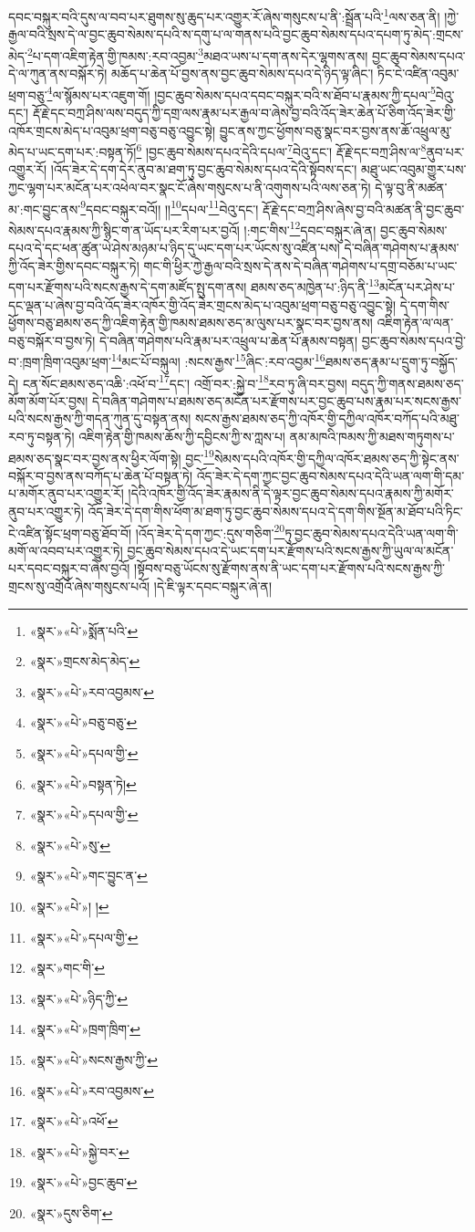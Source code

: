 དབང་བསྐུར་བའི་དུས་ལ་བབ་པར་ཐུགས་སུ་ཆུད་པར་འགྱུར་རོ་ཞེས་གསུངས་པ་ནི་:སྦྲོན་པའི་\footnote{«སྣར་»«པེ་»སྨོན་པའི་}ལས་ཅན་ནི། །ཀྱེ་རྒྱལ་བའི་སྲས་དེ་ལ་བྱང་ཆུབ་སེམས་དཔའི་ས་དགུ་པ་ལ་གནས་པའི་བྱང་ཆུབ་སེམས་དཔའ་དཔག་ཏུ་མེད་:གྲངས་མེད་\footnote{«སྣར་»གྲངས་མེད་མེད་}པ་དག་འཇིག་རྟེན་གྱི་ཁམས་:རབ་འབྱམ་\footnote{«སྣར་»«པེ་»རབ་འབྱམས་}མཐའ་ཡས་པ་དག་ནས་དེར་ལྷགས་ནས། བྱང་ཆུབ་སེམས་དཔའ་དེ་ལ་ཀུན་ནས་བསྐོར་ཏེ། མཆོད་པ་ཆེན་པོ་བྱས་ནས་བྱང་ཆུབ་སེམས་དཔའ་དེ་ཉིད་ལྟ་ཞིང་། ཏིང་ངེ་འཛིན་འབུམ་ཕྲག་བཅུ་\footnote{«སྣར་»«པེ་»བཅུ་བཅུ་}ལ་སྙོམས་པར་འཇུག་གོ། །བྱང་ཆུབ་སེམས་དཔའ་དབང་བསྐུར་བའི་ས་ཐོབ་པ་རྣམས་ཀྱི་དཔལ་\footnote{«སྣར་»«པེ་»དཔལ་གྱི་}བེའུ་དང་། རྡོ་རྗེ་དང་བཀྲ་ཤིས་ལས་བདུད་ཀྱི་དགྲ་ལས་རྣམ་པར་རྒྱལ་བ་ཞེས་བྱ་བའི་འོད་ཟེར་ཆེན་པོ་ཅིག་འོད་ཟེར་གྱི་འཁོར་གྲངས་མེད་པ་འབུམ་ཕྲག་བཅུ་བཅུ་འབྱུང་སྟེ། བྱུང་ནས་ཀྱང་ཕྱོགས་བཅུ་སྣང་བར་བྱས་ནས་ཆོ་འཕྲུལ་མུ་མེད་པ་ཡང་དག་པར་:བསྟན་ཏོ།\footnote{«སྣར་»«པེ་»བསྟན་ཏེ།} །བྱང་ཆུབ་སེམས་དཔའ་དེའི་དཔལ་\footnote{«སྣར་»«པེ་»དཔལ་གྱི་}བེའུ་དང་། རྡོ་རྗེ་དང་བཀྲ་ཤིས་ལ་\footnote{«སྣར་»«པེ་»སུ་}ནུབ་པར་འགྱུར་རོ། །འོད་ཟེར་དེ་དག་དེར་ནུབ་མ་ཐག་ཏུ་བྱང་ཆུབ་སེམས་དཔའ་དེའི་སྟོབས་དང་། མཐུ་ཡང་འབུམ་གྱུར་པས་ཀྱང་ལྷག་པར་མངོན་པར་འཕེལ་བར་སྣང་ངོ་ཞེས་གསུངས་པ་ནི་འགུགས་པའི་ལས་ཅན་ཏེ། དེ་ལྟ་བུ་ནི་མཚན་མ་:གང་བྱུང་ནས་\footnote{«སྣར་»«པེ་»གང་བྱུང་ན་}དབང་བསྐུར་བའོ།། །།\footnote{«སྣར་»«པེ་»། །}དཔལ་\footnote{«སྣར་»«པེ་»དཔལ་གྱི་}བེའུ་དང་། རྡོ་རྗེ་དང་བཀྲ་ཤིས་ཞེས་བྱ་བའི་མཚན་ནི་བྱང་ཆུབ་སེམས་དཔའ་རྣམས་ཀྱི་སྙིང་ག་ན་ཡོད་པར་རིག་པར་བྱའོ། །:གང་གིས་\footnote{«སྣར་»གང་གི་}དབང་བསྐུར་ཞེ་ན། བྱང་ཆུབ་སེམས་དཔའ་དེ་དང་ཕན་ཚུན་ཡེ་ཤེས་མཉམ་པ་ཉིད་དུ་ཡང་དག་པར་ཡོངས་སུ་འཛིན་པས། དེ་བཞིན་གཤེགས་པ་རྣམས་ཀྱི་འོད་ཟེར་གྱིས་དབང་བསྐུར་ཏེ། གང་གི་ཕྱིར་ཀྱེ་རྒྱལ་བའི་སྲས་དེ་ནས་དེ་བཞིན་གཤེགས་པ་དགྲ་བཅོམ་པ་ཡང་དག་པར་རྫོགས་པའི་སངས་རྒྱས་དེ་དག་མཛོད་སྤུ་དག་ནས། ཐམས་ཅད་མཁྱེན་པ་:ཉིད་ནི་\footnote{«སྣར་»«པེ་»ཉིད་ཀྱི་}མངོན་པར་ཤེས་པ་དང་ལྡན་པ་ཞེས་བྱ་བའི་འོད་ཟེར་འཁོར་གྱི་འོད་ཟེར་གྲངས་མེད་པ་འབུམ་ཕྲག་བཅུ་བཅུ་འབྱུང་སྟེ། དེ་དག་གིས་ཕྱོགས་བཅུ་ཐམས་ཅད་ཀྱི་འཇིག་རྟེན་གྱི་ཁམས་ཐམས་ཅད་མ་ལུས་པར་སྣང་བར་བྱས་ནས། འཇིག་རྟེན་ལ་ལན་བཅུ་བསྐོར་བ་བྱས་ཏེ། དེ་བཞིན་གཤེགས་པའི་རྣམ་པར་འཕྲུལ་པ་ཆེན་པོ་རྣམས་བསྟན། བྱང་ཆུབ་སེམས་དཔའ་བྱེ་བ་:ཁྲག་ཁྲིག་འབུམ་ཕྲག་\footnote{«སྣར་»«པེ་»ཁྲག་ཁྲིག་}མང་པོ་བསྐུལ། :སངས་རྒྱས་\footnote{«སྣར་»«པེ་»སངས་རྒྱས་ཀྱི་}ཞིང་:རབ་འབྱམ་\footnote{«སྣར་»«པེ་»རབ་འབྱམས་}ཐམས་ཅད་རྣམ་པ་དྲུག་ཏུ་བསྐྱོད་དེ། ངན་སོང་ཐམས་ཅད་འཆི་:འཕོ་བ་\footnote{«སྣར་»«པེ་»འཕོ་}དང་། འགྲོ་བར་:སྐྱེ་བ་\footnote{«སྣར་»«པེ་»སྐྱེ་བར་}རབ་ཏུ་ཞི་བར་བྱས། བདུད་ཀྱི་གནས་ཐམས་ཅད་མོག་མོག་པོར་བྱས། དེ་བཞིན་གཤེགས་པ་ཐམས་ཅད་མངོན་པར་རྫོགས་པར་བྱང་ཆུབ་པས་རྣམ་པར་སངས་རྒྱས་པའི་སངས་རྒྱས་ཀྱི་གདན་ཀུན་དུ་བསྟན་ནས། སངས་རྒྱས་ཐམས་ཅད་ཀྱི་འཁོར་གྱི་དཀྱིལ་འཁོར་བཀོད་པའི་མཐུ་རབ་ཏུ་བསྟན་ཏེ། འཇིག་རྟེན་གྱི་ཁམས་ཆོས་ཀྱི་དབྱིངས་ཀྱི་ས་ཀླས་པ། ནམ་མཁའི་ཁམས་ཀྱི་མཐས་གཏུགས་པ་ཐམས་ཅད་སྣང་བར་བྱས་ནས་ཕྱིར་ལོག་སྟེ། བྱང་\footnote{«སྣར་»«པེ་»བྱང་ཆུབ་}སེམས་དཔའི་འཁོར་གྱི་དཀྱིལ་འཁོར་ཐམས་ཅད་ཀྱི་སྟེང་ནས་བསྐོར་བ་བྱས་ནས་བཀོད་པ་ཆེན་པོ་བསྟན་ཏེ། འོད་ཟེར་དེ་དག་ཀྱང་བྱང་ཆུབ་སེམས་དཔའ་དེའི་ཡན་ལག་གི་དམ་པ་མགོར་ནུབ་པར་འགྱུར་རོ། །དེའི་འཁོར་གྱི་འོད་ཟེར་རྣམས་ནི་དེ་ལྟར་བྱང་ཆུབ་སེམས་དཔའ་རྣམས་ཀྱི་མགོར་ནུབ་པར་འགྱུར་ཏེ། འོད་ཟེར་དེ་དག་གིས་ཕོག་མ་ཐག་ཏུ་བྱང་ཆུབ་སེམས་དཔའ་དེ་དག་གིས་སྔོན་མ་ཐོབ་པའི་ཏིང་ངེ་འཛིན་སྟོང་ཕྲག་བཅུ་ཐོབ་བོ། །འོད་ཟེར་དེ་དག་ཀྱང་:དུས་གཅིག་\footnote{«སྣར་»དུས་ཅིག་}ཏུ་བྱང་ཆུབ་སེམས་དཔའ་དེའི་ཡན་ལག་གི་མགོ་ལ་འབབ་པར་འགྱུར་ཏེ། བྱང་ཆུབ་སེམས་དཔའ་དེ་ཡང་དག་པར་རྫོགས་པའི་སངས་རྒྱས་ཀྱི་ཡུལ་ལ་མངོན་པར་དབང་བསྐུར་བ་ཞེས་བྱའོ། །སྟོབས་བཅུ་ཡོངས་སུ་རྫོགས་ནས་ནི་ཡང་དག་པར་རྫོགས་པའི་སངས་རྒྱས་ཀྱི་གྲངས་སུ་འགྲོའོ་ཞེས་གསུངས་པའོ། །དེ་ཇི་ལྟར་དབང་བསྐུར་ཞེ་ན། 